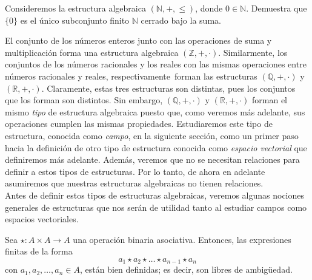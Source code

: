 \documentclass[notasLineal]{subfiles}
\begin{document}
\begin{Ejer}\label{ejercicio-2}
    Consideremos la estructura algebraica $(\mathbb{N},+,\le)$, donde $0\in\mathbb{N}$. Demuestra que $\{0\}$ es el único subconjunto finito $\mathbb{N}$ cerrado bajo la suma.
\end{Ejer}

El conjunto de los números enteros junto con las operaciones de suma y multiplicación forma una estructura algebraica $(\mathbb{Z},+,\cdot)$. Similarmente, los conjuntos de los números racionales y los reales con las mismas operaciones \textemdash entre números racionales y reales, respectivamente\textemdash \ forman las estructuras $(\mathbb{Q},+,\cdot)$ y $(\mathbb{R},+,\cdot)$. Claramente, estas tres estructuras son distintas, pues los conjuntos que los forman son distintos. Sin embargo, $(\mathbb{Q},+,\cdot)$ y $(\mathbb{R},+,\cdot)$ forman el mismo \emph{tipo} de estructura algebraica puesto que, como veremos más adelante, sus operaciones cumplen las mismas propiedades. Estudiaremos este tipo de estructura, conocida como \emph{campo}, en la siguiente sección, como un primer paso hacia la definición de otro tipo de estructura conocida como \emph{espacio vectorial} que definiremos más adelante. Además, veremos que no se necesitan relaciones para definir a estos tipos de estructuras. Por lo tanto, de ahora en adelante asumiremos que nuestras estructuras algebraicas no tienen relaciones. \\

Antes de definir estos tipos de estructuras algebraicas, veremos algunas nociones generales de estructuras que nos serán de utilidad tanto al estudiar campos como espacios vectoriales.
    
\begin{Prop}[]\label{Prop: Operación binaria asociativa}
    Sea $\star:A\times A\to A$ una operación binaria asociativa. Entonces, las expresiones finitas de la forma $$a_1\star a_2\star\dots\star a_{n-1}\star a_n$$ con $a_1,a_2,\dots,a_n\in A$, están bien definidas; es decir, son libres de ambigüedad.
\end{Prop}
\end{document}
